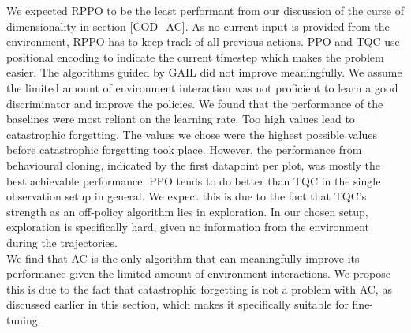 We expected RPPO to be the least performant from our discussion of the curse of dimensionality in section \ref{COD_AC}. As no current input 
is provided from the environment, RPPO has to keep track of all previous actions. PPO and TQC use positional encoding to indicate the current 
timestep which makes the problem easier. The algorithms guided by GAIL did not improve meaningfully. We assume the limited amount of environment 
interaction was not proficient to learn a good discriminator and improve the policies. We found that the performance of the baselines were most 
reliant on the learning rate. Too high values lead to catastrophic forgetting. The values we chose were the highest possible values before 
catastrophic forgetting took place. However, the performance from behavioural cloning, indicated by the first datapoint per plot, was mostly 
the best achievable performance. PPO tends to do better than TQC in the single observation setup in general. We expect this is due to the 
fact that TQC's strength as an off-policy algorithm lies in exploration. In our chosen setup, exploration is specifically hard, given no 
information from the environment during the trajectories.\\

We find that AC is the only algorithm that can meaningfully improve its performance given the limited amount of environment interactions. 
We propose this is due to the fact that catastrophic forgetting is not a problem with AC, as discussed earlier in this section, which makes 
it specifically suitable for fine-tuning.

